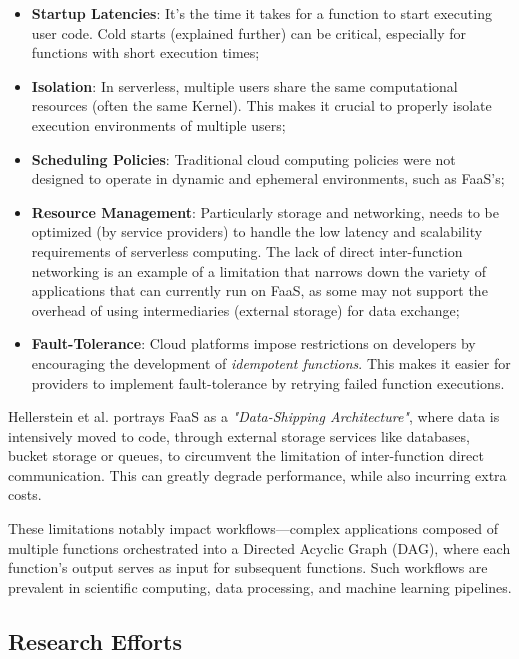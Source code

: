 \begin{itemize}
    \item \textbf{Startup Latencies}: It's the time it takes for a function to start executing user code. Cold starts (explained further) can be critical, especially for functions with short execution times;
    \item \textbf{Isolation}: In serverless, multiple users share the same computational resources (often the same Kernel). This makes it crucial to properly isolate execution environments of multiple users;
    \item \textbf{Scheduling Policies}: Traditional cloud computing policies were not designed to operate in dynamic and ephemeral environments, such as FaaS's;
    \item \textbf{Resource Management}: Particularly storage and networking, needs to be optimized (by service providers) to handle the low latency and scalability requirements of serverless computing. The lack of direct inter-function networking is an example of a limitation that narrows down the variety of applications that can currently run on FaaS, as some may not support the overhead of using intermediaries (external storage) for data exchange;
    \item \textbf{Fault-Tolerance}: Cloud platforms impose restrictions on developers by encouraging the development of \textit{idempotent functions}. This makes it easier for providers to implement fault-tolerance by retrying failed function executions.
\end{itemize}

Hellerstein et al. \cite{serverless_computing_drawbacks_survey_rw1} portrays FaaS as a \textit{"Data-Shipping Architecture"}, where data is intensively moved to code, through external storage services like databases, bucket storage or queues, to circumvent the limitation of inter-function direct communication. This can greatly degrade performance, while also incurring extra costs.

These limitations notably impact workflows—complex applications composed of multiple functions orchestrated into a Directed Acyclic Graph (DAG), where each function's output serves as input for subsequent functions. Such workflows are prevalent in scientific computing, data processing, and machine learning pipelines. 

\subsection{Research Efforts}

